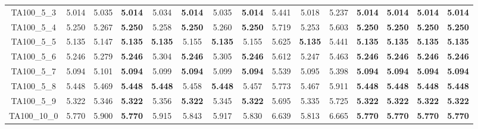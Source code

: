 \begin{tabular}{cc||ccccccccccccc}
TA100\_5\_3        & 5.014            & 5.035            & {\bf 5.014}      & 5.034            & {\bf 5.014}      & 5.035            & {\bf 5.014}      & 5.441            & 5.018            & 5.237            & {\bf 5.014}      & {\bf 5.014}      & {\bf 5.014}      & {\bf 5.014}     \\ 
TA100\_5\_4        & 5.250            & 5.267            & {\bf 5.250}      & 5.258            & {\bf 5.250}      & 5.260            & {\bf 5.250}      & 5.719            & 5.253            & 5.603            & {\bf 5.250}      & {\bf 5.250}      & {\bf 5.250}      & {\bf 5.250}     \\ 
TA100\_5\_5        & 5.135            & 5.147            & {\bf 5.135}      & {\bf 5.135}      & 5.155            & {\bf 5.135}      & 5.155            & 5.625            & {\bf 5.135}      & 5.441            & {\bf 5.135}      & {\bf 5.135}      & {\bf 5.135}      & {\bf 5.135}     \\ 
TA100\_5\_6        & 5.246            & 5.279            & {\bf 5.246}      & 5.304            & {\bf 5.246}      & 5.305            & {\bf 5.246}      & 5.612            & 5.247            & 5.463            & {\bf 5.246}      & {\bf 5.246}      & {\bf 5.246}      & {\bf 5.246}     \\ 
TA100\_5\_7        & 5.094            & 5.101            & {\bf 5.094}      & 5.099            & {\bf 5.094}      & 5.099            & {\bf 5.094}      & 5.539            & 5.095            & 5.398            & {\bf 5.094}      & {\bf 5.094}      & {\bf 5.094}      & {\bf 5.094}     \\ 
TA100\_5\_8        & 5.448            & 5.469            & {\bf 5.448}      & {\bf 5.448}      & 5.458            & {\bf 5.448}      & 5.457            & 5.773            & 5.467            & 5.911            & {\bf 5.448}      & {\bf 5.448}      & {\bf 5.448}      & {\bf 5.448}     \\ 
TA100\_5\_9        & 5.322            & 5.346            & {\bf 5.322}      & 5.356            & {\bf 5.322}      & 5.345            & {\bf 5.322}      & 5.695            & 5.335            & 5.725            & {\bf 5.322}      & {\bf 5.322}      & {\bf 5.322}      & {\bf 5.322}     \\ 
TA100\_10\_0       & 5.770            & 5.900            & {\bf 5.770}      & 5.915            & 5.843            & 5.917            & 5.830            & 6.639            & 5.813            & 6.665            & {\bf 5.770}      & {\bf 5.770}      & {\bf 5.770}      & {\bf 5.770}     \\ 

\end{tabular}
